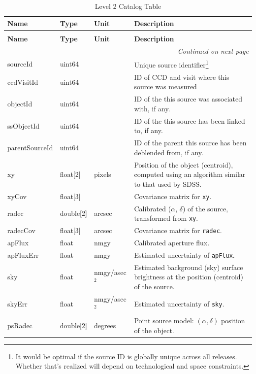 \documentclass[SE,lsstdraft,toc]{lsstdoc}
\newenvironment{schema}[3]{%
\setlength\LTleft{0pt}
\setlength\LTright{\fill}
\begin{longtable}{p{0.2\textwidth}p{0.14\textwidth}p{0.14\textwidth}p{0.41\textwidth}}

\caption[#1]{#2\label{#3}}\\

\hline \textbf{Name} & \textbf{Type} & \textbf{Unit} & \textbf{Description}\\ \hline
\endfirsthead

\caption[#1]{#2}\\

\hline \textbf{Name} & \textbf{Type} & \textbf{Unit} & \textbf{Description}\\ \hline
\endhead

\hline \multicolumn{4}{r}{\emph{Continued on next page}} \\
\endfoot

\hline\hline
\endlastfoot
}{%
\hline
\end{longtable}
}
\begin{document}
\begin{schema}{\Source Table}{Level 2 Catalog \Source Table}{tbl:sourceTable}

sourceId & uint64 & ~ & Unique source identifier\footnote{It would be optimal if the source ID is globally unique across all releases. Whether that's realized will depend on technological and space constraints.} \\

ccdVisitId & uint64 & ~ & ID of CCD and visit where this source was measured \\

objectId & uint64 & ~ & ID of the \Object this source was associated with, if any. \\

ssObjectId & uint64 & ~ & ID of the \SSObject this source has been linked to, if any. \\

parentSourceId & uint64 & ~ & ID of the parent \Source this source has been deblended from, if any. \\

xy & float[2] & pixels & Position of the object (centroid), computed using an algorithm similar to that used by SDSS.\\

xyCov & float[3] & ~ & Covariance matrix for \texttt{xy}. \\

radec & double[2] & arcsec & Calibrated ($\alpha$, $\delta$) of the source, transformed from \texttt{xy}.\\

radecCov & float[3] & arcsec & Covariance matrix for \texttt{radec}. \\

apFlux & float & nmgy & Calibrated aperture flux. \\

apFluxErr & float & nmgy &  Estimated uncertainty of \texttt{apFlux}. \\

sky & float & nmgy/asec$^{2}$ & Estimated background (sky) surface brightness at the position (centroid) of the source. \\

skyErr & float & nmgy/asec$^{2}$ & Estimated uncertainty of \texttt{sky}. \\

psRadec & double[2] & degrees & Point source model: $(\alpha, \delta)$ position of the object. \\


\end{schema}
\end{document}
